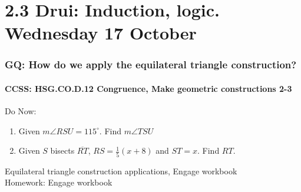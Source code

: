 \documentclass{beamer}
\begin{document}
\section{2.3 Drui: Induction, logic. Wednesday 17 October}
  \frame
  {
    \frametitle{GQ: How do we apply the equilateral triangle construction?}
    \framesubtitle{CCSS: HSG.CO.D.12 Congruence, Make geometric constructions  \alert{2-3}}

    \begin{block}{Do Now:}
    \begin{enumerate}
      \begin{center}
      \end{center}
      \item Given $m\angle RSU = 115^\circ$. Find $m\angle TSU$
      \item Given $S$ bisects $\overline{RT}$, $RS=\frac{1}{5} (x+8)$ and $ST = x$. Find $RT$.
    \end{enumerate}
    \end{block}
    Equilateral triangle construction applications, Engage workbook\\
    \vspace{0.25cm}
    Homework: Engage workbook
  }
\end{document}
